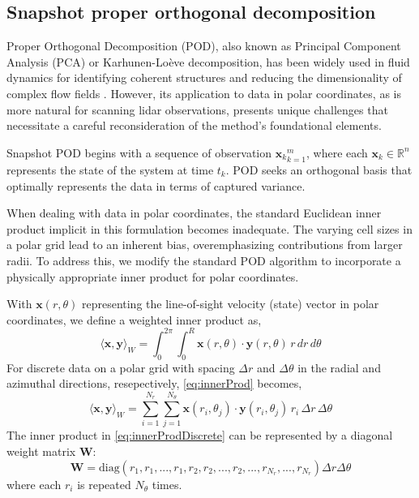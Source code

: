 \documentclass[%
 aip,
 amsmath,
 amssymb,
preprint,%
]{revtex4-2}
\begin{document}

\subsection{Snapshot proper orthogonal decomposition}
\label{sec:POD}

Proper Orthogonal Decomposition (POD), also known as Principal Component Analysis (PCA) or Karhunen-Loève decomposition, has been widely used in fluid dynamics for identifying coherent structures and reducing the dimensionality of complex flow fields \cite{berkooz_proper_1993}. 
However, its application to data in polar coordinates, as is more natural for scanning lidar observations, presents unique challenges that necessitate a careful reconsideration of the method's foundational elements.

Snapshot POD begins with a sequence of observation ${\mathbf{x}_k}_{k=1}^m$, where each $\mathbf{x}_k \in \mathbb{R}^n$ represents the state of the system at time $t_k$. 
POD seeks  an orthogonal basis that optimally represents the data in terms of captured variance.

When dealing with data in polar coordinates, the standard Euclidean inner product implicit in this formulation becomes inadequate. 
The varying cell sizes in a polar grid lead to an inherent bias, overemphasizing contributions from larger radii. 
To address this, we modify the standard POD algorithm to incorporate a physically appropriate inner product for polar coordinates.

With $\mathbf{x}(r,\theta)$ representing the line-of-sight velocity (state) vector in polar coordinates, we define a weighted inner product as,
\begin{equation}
\langle \mathbf{x}, \mathbf{y} \rangle_W = \int_0^{2\pi} \int_0^R \mathbf{x}(r,\theta) \cdot \mathbf{y}(r,\theta) \, r \, dr \, d\theta
\label{eq:innerProd}
\end{equation}
For discrete data on a polar grid with spacing $\Delta r$ and $\Delta \theta$ in the radial and azimuthal directions, resepectively, \cref{eq:innerProd} becomes,
\begin{equation}
\langle \mathbf{x}, \mathbf{y} \rangle_W = \sum_{i=1}^{N_r} \sum_{j=1}^{N_\theta} \mathbf{x}(r_i, \theta_j) \cdot \mathbf{y}(r_i, \theta_j) \, r_i \, \Delta r \, \Delta \theta
\label{eq:innerProdDiscrete}
\end{equation}
The inner product in \cref{eq:innerProdDiscrete} can be represented by a diagonal weight matrix $\mathbf{W}$:
\begin{equation}
\mathbf{W} = \text{diag}(r_1, r_1, ..., r_1, r_2, r_2, ..., r_2, ..., r_{N_r}, ..., r_{N_r}) \Delta r \Delta \theta
\label{eq:weights}
\end{equation}
where each $r_i$ is repeated $N_\theta$ times.
\end{document}

